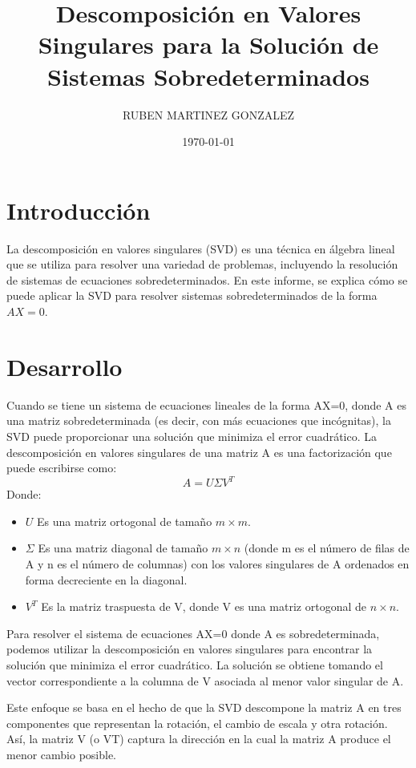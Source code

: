 \documentclass{article}
\title{Descomposición en Valores Singulares para la Solución de Sistemas Sobredeterminados}
\author{RUBEN MARTINEZ GONZALEZ}
\date{\today}
\begin{document}
    \maketitle


    \section{Introducción}\label{sec:introduccion}
    La descomposición en valores singulares (SVD) es una técnica en álgebra lineal que se utiliza para resolver una variedad de problemas,
    incluyendo la resolución de sistemas de ecuaciones sobredeterminados.
    En este informe, se explica cómo se puede aplicar la SVD para resolver sistemas sobredeterminados de la forma $AX = 0$.


    \section{Desarrollo}\label{sec:desarrollo}
    Cuando se tiene un sistema de ecuaciones lineales de la forma AX=0, donde A es una matriz sobredeterminada
    (es decir, con más ecuaciones que incógnitas), la SVD puede proporcionar una solución que minimiza el error cuadrático.
    La descomposición en valores singulares de una matriz A es una factorización que puede escribirse como:
    \begin{equation}
        A = U \Sigma V^T\label{eq:equation}
    \end{equation}
    Donde:
    \begin{itemize}
        \item $U$ Es una matriz ortogonal de tamaño $m \times m$.
        \item $\Sigma$ Es una matriz diagonal de tamaño $m \times n$ (donde m es el número de filas de A y n es el número de columnas)
        con los valores singulares de A ordenados en forma decreciente en la diagonal.
        \item $V^T$ Es la matriz traspuesta de V, donde V es una matriz ortogonal de $n \times n$.
    \end{itemize}
    Para resolver el sistema de ecuaciones AX=0 donde A es sobredeterminada, podemos utilizar la descomposición en valores singulares
    para encontrar la solución que minimiza el error cuadrático.
    La solución se obtiene tomando el vector correspondiente a la columna de V asociada al menor valor singular de A.

    \noindent
    Este enfoque se basa en el hecho de que la SVD descompone la matriz A en tres componentes que representan la rotación,
    el cambio de escala y otra rotación.
    Así, la matriz V (o VT) captura la dirección en la cual la matriz A produce el menor cambio posible.
\end{document}
